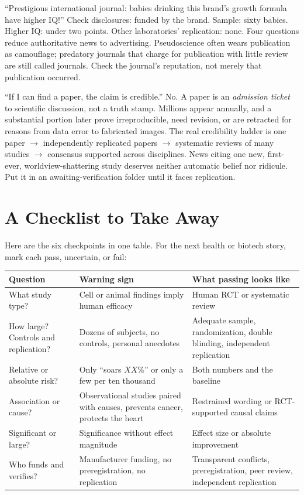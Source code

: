 ``Prestigious international journal: babies drinking this brand's growth formula have higher IQ!'' Check disclosures: funded by the brand. Sample: sixty babies. Higher IQ: under two points. Other laboratories' replication: none. Four questions reduce authoritative news to advertising. Pseudoscience often wears publication as camouflage; predatory journals that charge for publication with little review are still called journals. Check the journal's reputation, not merely that publication occurred.

\begin{wuqu}
``If I can find a paper, the claim is credible.'' No. A paper is an \emph{admission ticket} to scientific discussion, not a truth stamp. Millions appear annually, and a substantial portion later prove irreproducible, need revision, or are retracted for reasons from data error to fabricated images. The real credibility ladder is one paper $\rightarrow$ independently replicated papers $\rightarrow$ systematic reviews of many studies $\rightarrow$ consensus supported across disciplines. News citing one new, first-ever, worldview-shattering study deserves neither automatic belief nor ridicule. Put it in an awaiting-verification folder until it faces replication.
\end{wuqu}

\section{A Checklist to Take Away}

Here are the six checkpoints in one table. For the next health or biotech story, mark each pass, uncertain, or fail:

\begin{table}[htbp]
\centering
\begin{tabular}{p{}p{}p{}}
\toprule
\textbf{Question} & \textbf{Warning sign} & \textbf{What passing looks like} \\
\midrule
What study type? & Cell or animal findings imply human efficacy & Human RCT or systematic review \\
How large? Controls and replication? & Dozens of subjects, no controls, personal anecdotes & Adequate sample, randomization, double blinding, independent replication \\
Relative or absolute risk? & Only ``soars $XX\%$'' or only a few per ten thousand & Both numbers and the baseline \\
Association or cause? & Observational studies paired with causes, prevents cancer, protects the heart & Restrained wording or RCT-supported causal claims \\
Significant or large? & Significance without effect magnitude & Effect size or absolute improvement \\
Who funds and verifies? & Manufacturer funding, no preregistration, no replication & Transparent conflicts, preregistration, peer review, independent replication \\
\bottomrule
\end{tabular}
\end{table}

